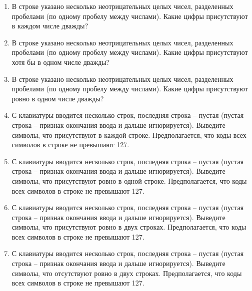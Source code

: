 \begin{enumerate}
\item В строке указано несколько неотрицательных целых чисел, разделенных пробелами (по одному
пробелу между числами). Какие цифры присутствуют в каждом числе дважды?

\item В строке указано несколько неотрицательных целых чисел, разделенных пробелами (по одному
пробелу между числами). Какие цифры присутствуют хотя бы в одном числе дважды?

\item В строке указано несколько неотрицательных целых чисел, разделенных пробелами (по одному
пробелу между числами). Какие цифры присутствуют ровно в одном числе дважды?

\item С клавиатуры вводится несколько строк, последняя строка -- пустая (пустая строка -- признак окончания ввода и дальше игнорируется). Выведите символы, что присутствуют в каждой строке. Предполагается, что коды всех символов в строке не превышают 127.

\item С клавиатуры вводится несколько строк, последняя строка -- пустая (пустая строка -- признак окончания ввода и дальше игнорируется). Выведите символы, что присутствуют ровно в одной строке. 
Предполагается, что коды всех символов в строке не превышают 127.

\item С клавиатуры вводится несколько строк, последняя строка -- пустая (пустая строка -- признак окончания ввода и дальше игнорируется). Выведите символы, что присутствуют ровно в двух строках.
Предполагается, что коды всех символов в строке не превышают 127.


\item С клавиатуры вводится несколько строк, последняя строка -- пустая (пустая строка -- признак окончания ввода и дальше игнорируется). Выведите символы, что отсутствуют ровно в двух строках.
Предполагается, что коды всех символов в строке не превышают 127.



\end{enumerate}
